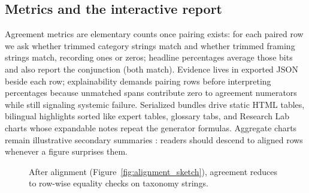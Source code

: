 \documentclass[11pt,a4paper]{article}
\theoremstyle{remark}
\begin{document}
\subsection{Metrics and the interactive report}
Agreement metrics are elementary counts once pairing exists: for each paired row we ask whether trimmed category strings match and whether trimmed framing strings match, recording ones or zeros; headline percentages average those bits and also report the conjunction (both match). Evidence lives in exported JSON beside each row; explainability demands pairing rows before interpreting percentages because unmatched spans contribute zero to agreement numerators while still signaling systemic failure. Serialized bundles drive static HTML tables, bilingual highlights sorted like expert tables, glossary tabs, and Research Lab charts whose expandable notes repeat the generator formulas. Aggregate charts remain illustrative secondary summaries \citep{carletta1996assessing,gwet2021handbook}: readers should descend to aligned rows whenever a figure surprises them.

\begin{figure}[htbp]
\centering
{}
\caption{After alignment (Figure~\ref{fig:alignment_sketch}), agreement reduces to row-wise equality checks on taxonomy strings.}
\label{fig:metrics_bits}
\end{figure}

\end{document}
